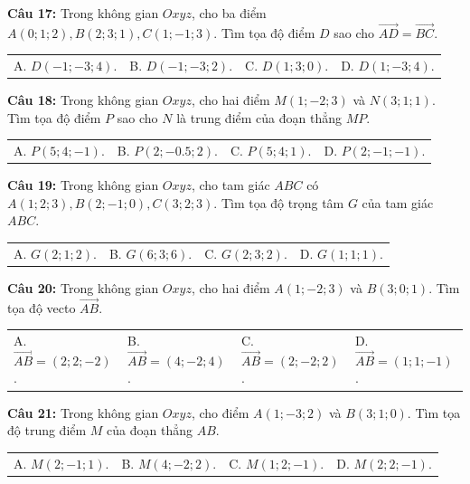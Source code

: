 \documentclass[12pt]{article}
\begin{document}
	\vspace{2mm}
	\noindent \textbf{Câu 17:} Trong không gian $Oxyz$, cho ba điểm $A(0; 1; 2), B(2; 3; 1), C(1; -1; 3)$. Tìm tọa độ điểm $D$ sao cho $\vec{AD} = \vec{BC}$. \\
	\noindent
	\begin{tabular}{p{} p{} p{} p{}}
		A. $D(-1; -3; 4)$. & B. $D(-1; -3; 2)$. & C. $D(1; 3; 0)$. & D. $D(1; -3; 4)$.
	\end{tabular}
	
	\vspace{2mm}
	\noindent \textbf{Câu 18:} Trong không gian $Oxyz$, cho hai điểm $M(1; -2; 3)$ và $N(3; 1; 1)$. Tìm tọa độ điểm $P$ sao cho $N$ là trung điểm của đoạn thẳng $MP$. \\
	\noindent
	\begin{tabular}{p{} p{} p{} p{}}
		A. $P(5; 4; -1)$. & B. $P(2; -0.5; 2)$. & C. $P(5; 4; 1)$. & D. $P(2; -1; -1)$.
	\end{tabular}
	
	\vspace{2mm}
	\noindent \textbf{Câu 19:} Trong không gian $Oxyz$, cho tam giác $ABC$ có $A(1; 2; 3), B(2; -1; 0), C(3; 2; 3)$. Tìm tọa độ trọng tâm $G$ của tam giác $ABC$. \\
	\noindent
	\begin{tabular}{p{} p{} p{} p{}}
		A. $G(2; 1; 2)$. & B. $G(6; 3; 6)$. & C. $G(2; 3; 2)$. & D. $G(1; 1; 1)$.
	\end{tabular}
	
	\vspace{2mm}
	\noindent \textbf{Câu 20:} Trong không gian $Oxyz$, cho hai điểm $A(1; -2; 3)$ và $B(3; 0; 1)$. Tìm tọa độ vecto $\vec{AB}$. \\
	\noindent
	\begin{tabular}{p{} p{} p{} p{}}
		A. $\vec{AB} = (2; 2; -2)$. & B. $\vec{AB} = (4; -2; 4)$. & C. $\vec{AB} = (2; -2; 2)$. & D. $\vec{AB} = (1; 1; -1)$.
	\end{tabular}
	
	\vspace{2mm}
	\noindent \textbf{Câu 21:} Trong không gian $Oxyz$, cho điểm $A(1; -3; 2)$ và $B(3; 1; 0)$. Tìm tọa độ trung điểm $M$ của đoạn thẳng $AB$. \\
	\noindent
	\begin{tabular}{p{} p{} p{} p{}}
		A. $M(2; -1; 1)$. & B. $M(4; -2; 2)$. & C. $M(1; 2; -1)$. & D. $M(2; 2; -1)$.
	\end{tabular}
	
\end{document}
